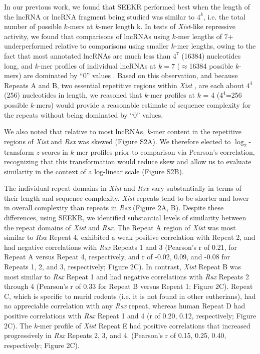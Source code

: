 In our previous work, we found that SEEKR performed best when the length of the lncRNA or lncRNA fragment being studied was similar to $4^k$, i.e. the total number of possible $k$-mers at $k$-mer length k. In tests of \emph{Xist}-like repressive activity, we found that comparisons of lncRNAs using $k$-mer lengths of $7$+ underperformed relative to comparisons using smaller $k$-mer lengths, owing to the fact that most annotated lncRNAs are much less than $4^7$ (16384) nucleotides long, and $k$-mer profiles of individual lncRNAs at $k=7$ ($\approx$16384 possible $k$-mers) are dominated by “0” values \cite{Kirk2018FunctionalContent}. Based on this observation, and because Repeats A and B, two essential repetitive regions within \emph{Xist}  \cite{Almeida2017PCGF3/5-PRC1Inactivation,Hoki2009AMouse,Pintacuda2017HnRNPKSilencing,Royce-Tolland2010TheInactivation,Wutz2002ChromosomalRNA}, are each about $4^4$ (256) nucleotides in length, we reasoned that $k$-mer profiles at $k$ = 4 ($4^4$=256 possible $k$-mers) would provide a reasonable estimate of sequence complexity for the repeats without being dominated by “0” values. 

We also noted that relative to most lncRNAs, $k$-mer content in the repetitive regions of \emph{Xist} and \emph{Rsx} was skewed (Figure S2A). We therefore elected to $\log_2$-transform $z$-scores in $k$-mer profiles prior to comparison via Pearson’s correlation, recognizing that this transformation would reduce skew and allow us to evaluate similarity in the context of a log-linear scale (Figure S2B).

The individual repeat domains in \emph{Xist} and \emph{Rsx} vary substantially in terms of their length and sequence complexity. \emph{Xist} repeats tend to be shorter and lower in overall complexity than repeats in \emph{Rsx} (Figure 2A, B). Despite these differences, using SEEKR, we identified substantial levels of similarity between the repeat domains of \emph{Xist} and \emph{Rsx}. The Repeat A region of \emph{Xist} was most similar to \emph{Rsx} Repeat 4, exhibited a weak positive correlation with Repeat 2, and had negative correlations with \emph{Rsx} Repeats 1 and 3 (Pearson’s r of 0.21, for Repeat A versus Repeat 4, respectively, and r of -0.02, 0.09, and -0.08 for Repeats 1, 2, and 3, respectively; Figure 2C). In contrast, \emph{Xist} Repeat B was most similar to \emph{Rsx} Repeat 1 and had negative correlations with \emph{Rsx} Repeats 2 through 4 (Pearson’s r of 0.33 for Repeat B versus Repeat 1; Figure 2C). Repeat C, which is specific to murid rodents (i.e. it is not found in other eutherians), had no appreciable correlation with any \emph{Rsx} repeat, whereas human Repeat D had positive correlations with \emph{Rsx} Repeat 1 and 4 (r of 0.20, 0.12, respectively; Figure 2C). The $k$-mer profile of \emph{Xist} Repeat E had positive correlations that increased progressively in \emph{Rsx} Repeats 2, 3, and 4. (Pearson’s r of 0.15, 0.25, 0.40, respectively; Figure 2C). 

